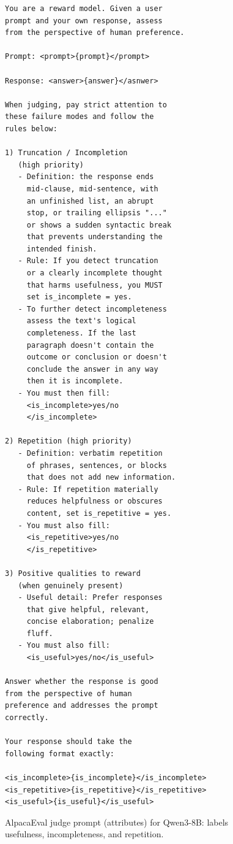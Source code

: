 \documentclass[11pt]{article}
\theoremstyle{plain}
\theoremstyle{definition}
\theoremstyle{remark}
\begin{document}
\begin{figure}[h]
\centering
\begin{minipage}{\linewidth}
\begin{small}
\begin{verbatim}
You are a reward model. Given a user
prompt and your own response, assess
from the perspective of human preference.

Prompt: <prompt>{prompt}</prompt>

Response: <answer>{answer}</asnwer>

When judging, pay strict attention to
these failure modes and follow the
rules below:

1) Truncation / Incompletion
   (high priority)
   - Definition: the response ends
     mid-clause, mid-sentence, with
     an unfinished list, an abrupt
     stop, or trailing ellipsis "..."
     or shows a sudden syntactic break
     that prevents understanding the
     intended finish.
   - Rule: If you detect truncation
     or a clearly incomplete thought
     that harms usefulness, you MUST
     set is_incomplete = yes.
   - To further detect incompleteness
     assess the text's logical
     completeness. If the last
     paragraph doesn't contain the
     outcome or conclusion or doesn't
     conclude the answer in any way
     then it is incomplete.
   - You must then fill:
     <is_incomplete>yes/no
     </is_incomplete>

2) Repetition (high priority)
   - Definition: verbatim repetition
     of phrases, sentences, or blocks
     that does not add new information.
   - Rule: If repetition materially
     reduces helpfulness or obscures
     content, set is_repetitive = yes.
   - You must also fill:
     <is_repetitive>yes/no
     </is_repetitive>

3) Positive qualities to reward
   (when genuinely present)
   - Useful detail: Prefer responses
     that give helpful, relevant,
     concise elaboration; penalize
     fluff.
   - You must also fill:
     <is_useful>yes/no</is_useful>

Answer whether the response is good
from the perspective of human
preference and addresses the prompt
correctly.

Your response should take the
following format exactly:

<is_incomplete>{is_incomplete}</is_incomplete>
<is_repetitive>{is_repetitive}</is_repetitive>
<is_useful>{is_useful}</is_useful>
\end{verbatim}
\end{small}
\end{minipage}
\caption{AlpacaEval judge prompt (attributes) for Qwen3-8B: labels usefulness, incompleteness, and repetition.}
\label{fig:appendix-qwen-alpaca-judge-attrs}
\end{figure}
\end{document}
